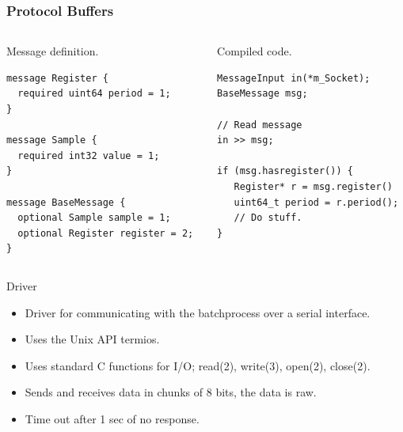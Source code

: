 \documentclass{beamer}
\begin{document}
\begin{frame}[fragile]
\frametitle{Protocol Buffers}
\begin{columns}
    \begin{column}{.5\textwidth}
    \normalsize
    Message definition.
    \footnotesize
    \begin{verbatim}
message Register {
  required uint64 period = 1;
}

message Sample {
  required int32 value = 1;
}

message BaseMessage {
  optional Sample sample = 1;
  optional Register register = 2;
}
\end{verbatim}
    \end{column}
    \begin{column}{.4\textwidth}
    \normalsize
    Compiled code.
    \footnotesize
    \begin{verbatim}
MessageInput in(*m_Socket);
BaseMessage msg;

// Read message
in >> msg;

if (msg.hasregister()) {
   Register* r = msg.register()
   uint64_t period = r.period();
   // Do stuff.
}
\end{verbatim}
    \end{column}
\end{columns}
\end{frame}


\begin{frame}{Driver}
        \begin{itemize}
            \item Driver for communicating with the batchprocess over a serial interface.
            \item Uses the Unix API termios.
            \item Uses standard C functions for I/O; read(2), write(3), open(2), close(2).
            \item Sends and receives data in chunks of 8 bits, the data is raw.
            \item Time out after 1 sec of no response.
        \end{itemize}
\end{frame}
\end{document}
